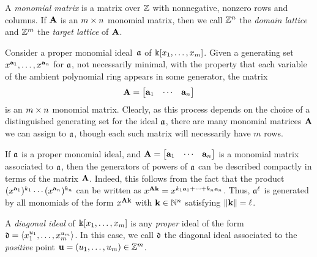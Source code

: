 \documentclass{article}
\begin{document}
\begin{definition}
\label{monomial matrix: D}
A \emph{monomial matrix} is a matrix over $\mathbb{Z}$ with nonnegative, nonzero rows and columns.
If $\mathbf{A}$ is an $m \times n$ monomial matrix, then we call $\mathbb{Z}^n$ the \emph{domain lattice} and $\mathbb{Z}^m$ the \emph{target lattice} of $\mathbf{A}$.
\end{definition}

\begin{remark}
   \label{monomial matrix ideal: R}
   Consider a proper monomial ideal~$\mathfrak{a}$ of $\Bbbk[x_1, \ldots, x_{m}]$.
   Given a generating set $x^{\mathbf{a}_1}, \ldots, x^{\mathbf{a}_n}$ for $\mathfrak{a}$, not necessarily minimal, with the property that each variable of the ambient polynomial ring appears in some generator, the matrix
   \[
      \mathbf{A}= \begin{bmatrix} \mathbf{a}_1 & \cdots & \mathbf{a}_n \end{bmatrix}
   \]
   is an  $m \times n$ monomial matrix.
   Clearly, as this process depends on the choice of a distinguished generating set for the ideal $\mathfrak{a}$, there are many monomial matrices $\mathbf{A}$ we can assign to $\mathfrak{a}$, though each such matrix will necessarily have $m$ rows.
\end{remark}

\begin{remark}
   \label{generators-via-exponent-matrix: R}
   If $\mathfrak{a}$ is a proper monomial ideal, and $\mathbf{A}= \begin{bmatrix} \mathbf{a}_1 & \cdots & \mathbf{a}_n \end{bmatrix}$ is a monomial matrix associated to $\mathfrak{a}$, then the generators of powers of $\mathfrak{a}$ can be described compactly in terms of the matrix $\mathbf{A}$.
   Indeed, this follows from the fact that the product $(x^{\mathbf{a}_1})^{k_1} \cdots (x^{\mathbf{a}_n})^{k_n}$ can be written as $x^{\mathbf{A} \mathbf{k}} = x^{k_1 \mathbf{a}_1 + \cdots + k_n \mathbf{a}_n}$.
   Thus, $\mathfrak{a}^\ell$ is generated by all monomials of the form $x^{\mathbf{A} \mathbf{k}}$ with $\mathbf{k} \in \mathbb{N}^n$ satisfying $\| \mathbf{k} \| = \ell$.
\end{remark}

\begin{definition}
   A  \emph{diagonal ideal} of $\Bbbk[x_1, \ldots, x_{m}]$ is any \emph{proper} ideal of the form $\mathfrak{d} = \langle x_1^{u_1}, \ldots, x_{m}^{u_{m}} \rangle$.
   In this case,  we call $\mathfrak{d}$ the diagonal ideal associated to the \emph{positive} point $\mathbf{u} = (u_1, \ldots, u_{m}) \in \mathbb{Z}^{m}$.
\end{definition}
\end{document}
